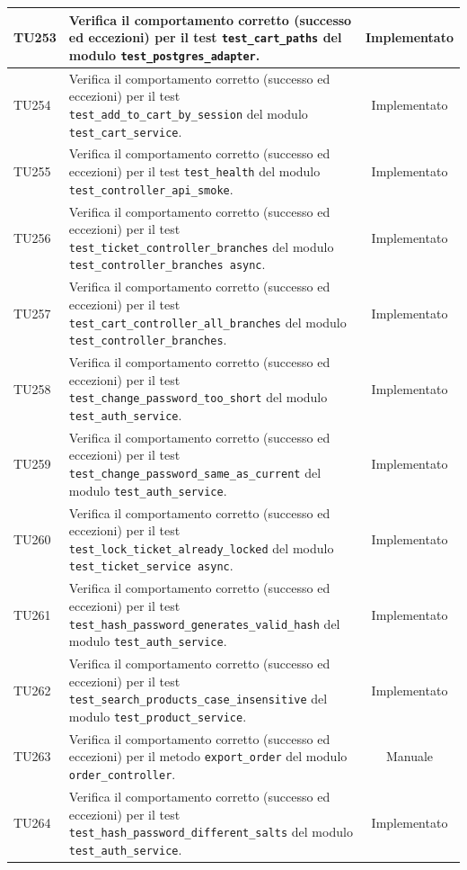 \documentclass[a4paper,11pt,oneside]{scrartcl}
\begin{document}
\begin{longtable}{|p{1.9cm}|p{11.6cm}|c|}
    TU253 & Verifica il comportamento corretto (successo ed eccezioni) per il test \texttt{test\_cart\_paths} del modulo \texttt{test\_postgres\_adapter}. & Implementato \\ \hline
    TU254 & Verifica il comportamento corretto (successo ed eccezioni) per il test \texttt{test\_add\_to\_cart\_by\_session} del modulo \texttt{test\_cart\_service}. & Implementato \\ \hline
    TU255 & Verifica il comportamento corretto (successo ed eccezioni) per il test \texttt{test\_health} del modulo \texttt{test\_controller\_api\_smoke}. & Implementato \\ \hline
    TU256 & Verifica il comportamento corretto (successo ed eccezioni) per il test \texttt{test\_ticket\_controller\_branches} del modulo \texttt{test\_controller\_branches async}. & Implementato \\ \hline
    TU257 & Verifica il comportamento corretto (successo ed eccezioni) per il test \texttt{test\_cart\_controller\_all\_branches} del modulo \texttt{test\_controller\_branches}. & Implementato \\ \hline
    TU258 & Verifica il comportamento corretto (successo ed eccezioni) per il test \texttt{test\_change\_password\_too\_short} del modulo \texttt{test\_auth\_service}. & Implementato \\ \hline
    TU259 & Verifica il comportamento corretto (successo ed eccezioni) per il test \texttt{test\_change\_password\_same\_as\_current} del modulo \texttt{test\_auth\_service}. & Implementato \\ \hline
    TU260 & Verifica il comportamento corretto (successo ed eccezioni) per il test \texttt{test\_lock\_ticket\_already\_locked} del modulo \texttt{test\_ticket\_service     async}. & Implementato \\ \hline
    TU261 & Verifica il comportamento corretto (successo ed eccezioni) per il test \texttt{test\_hash\_password\_generates\_valid\_hash} del modulo \texttt{test\_auth\_service}. & Implementato \\ \hline
    TU262 & Verifica il comportamento corretto (successo ed eccezioni) per il test \texttt{test\_search\_products\_case\_insensitive} del modulo \texttt{test\_product\_service}. & Implementato \\ \hline
    TU263 & Verifica il comportamento corretto (successo ed eccezioni) per il metodo \texttt{export\_order} del modulo \texttt{order\_controller}. & Manuale \\ \hline
    TU264 & Verifica il comportamento corretto (successo ed eccezioni) per il test \texttt{test\_hash\_password\_different\_salts} del modulo \texttt{test\_auth\_service}. & Implementato \\ \hline

\end{longtable}
\end{document}

